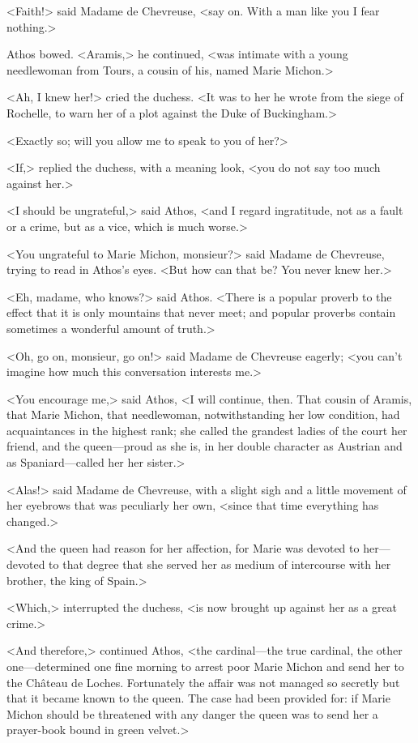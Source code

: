 <Faith!> said Madame de Chevreuse, <say on. With a man like you I fear nothing.>

Athos bowed. <Aramis,> he continued, <was intimate with a young needlewoman from Tours, a cousin of his, named Marie Michon.>

<Ah, I knew her!> cried the duchess. <It was to her he wrote from the siege of Rochelle, to warn her of a plot against the Duke of Buckingham.>

<Exactly so; will you allow me to speak to you of her?>

<If,> replied the duchess, with a meaning look, <you do not say too much against her.>

<I should be ungrateful,> said Athos, <and I regard ingratitude, not as a fault or a crime, but as a vice, which is much worse.>

<You ungrateful to Marie Michon, monsieur?> said Madame de Chevreuse, trying to read in Athos's eyes. <But how can that be? You never knew her.>

<Eh, madame, who knows?> said Athos. <There is a popular proverb to the effect that it is only mountains that never meet; and popular proverbs contain sometimes a wonderful amount of truth.>

<Oh, go on, monsieur, go on!> said Madame de Chevreuse eagerly; <you can't imagine how much this conversation interests me.>

<You encourage me,> said Athos, <I will continue, then. That cousin of Aramis, that Marie Michon, that needlewoman, notwithstanding her low condition, had acquaintances in the highest rank; she called the grandest ladies of the court her friend, and the queen—proud as she is, in her double character as Austrian and as Spaniard—called her her sister.>

<Alas!> said Madame de Chevreuse, with a slight sigh and a little movement of her eyebrows that was peculiarly her own, <since that time everything has changed.>

<And the queen had reason for her affection, for Marie was devoted to her—devoted to that degree that she served her as medium of intercourse with her brother, the king of Spain.>

<Which,> interrupted the duchess, <is now brought up against her as a great crime.>

<And therefore,> continued Athos, <the cardinal—the true cardinal, the other one—determined one fine morning to arrest poor Marie Michon and send her to the Château de Loches. Fortunately the affair was not managed so secretly but that it became known to the queen. The case had been provided for: if Marie Michon should be threatened with any danger the queen was to send her a prayer-book bound in green velvet.>


